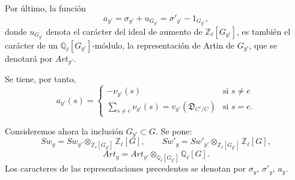 Por último, la función
\[
a_{y'}=\sigma_{y'}+u_{G_{y'}}=\sigma'_{y'}-1_{G_{y'}},
\tag{4.2.5}
\]
donde $u_{G_{y'}}$ denota el carácter del ideal de aumento de $\mathbb Z_\ell[G_{y'}]$, es también el carácter de un $\mathbb Q_\ell[G_{y'}]$-módulo, la representación de Artin de $G_{y'}$, que se denotará por $Art_{y'}$.

Se tiene, por tanto,
\[
a_{y'}(s)=
\begin{cases}
-\nu_{y'}(s)& \text{si } s\ne e\\[0.4em]
\displaystyle\sum_{s\ne e}\nu_{y'}(s)=v_{y'}(\mathfrak D_{C'/C})& \text{si } s=e.
\end{cases}
\tag{4.2.6}
\]

Consideremos ahora la inclusión $G_{y'}\subset G$. Se pone:
\[
Sw_y=Sw_{y'}\otimes_{\mathbb Z_\ell[G_{y'}]}\mathbb Z_\ell[G],
\qquad
Sw'_y=Sw'_{y'}\otimes_{\mathbb Z_\ell[G_{y'}]}\mathbb Z_\ell[G],
\tag{4.2.7}
\]
\[
Art_y=Art_{y'}\otimes_{\mathbb Q_\ell[G_{y'}]}\mathbb Q_\ell[G].
\tag{4.2.8}
\]
Los caracteres de las representaciones precedentes se denotan por $\sigma_y$, $\sigma'_y$, $a_y$.
